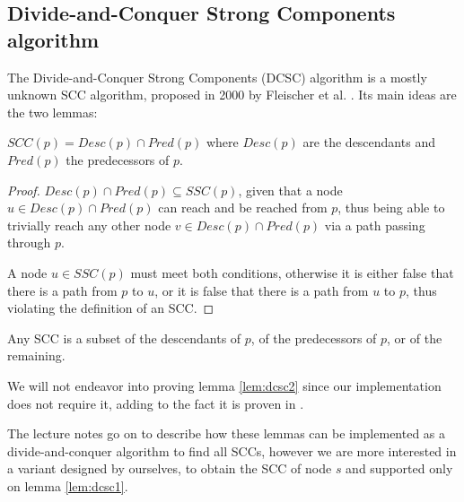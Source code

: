 \subsection[DCSC algorithm]{Divide-and-Conquer Strong Components algorithm} \label{algorithm-scc-dcsc}
The Divide-and-Conquer Strong Components (DCSC) algorithm is a mostly unknown SCC algorithm, proposed in 2000 by Fleischer et al. \cite{fleischer-dcsc}. Its main ideas are the two lemmas:
\begin{lemma} \label{lem:dcsc1}
    $SCC(p)=Desc(p) \cap Pred(p)$ where $Desc(p)$ are the descendants and $Pred(p)$ the predecessors of $p$.
\end{lemma}
\begin{proof}
    $Desc(p) \cap Pred(p) \subseteq SSC(p)$, given that a node $u \in Desc(p) \cap Pred(p)$ can reach and be reached from $p$, thus being able to trivially reach any other node $v \in Desc(p) \cap Pred(p)$ via a path passing through $p$.\par
    A node $u \in SSC(p)$ must meet both conditions, otherwise it is either false that there is a path from $p$ to $u$, or it is false that there is a path from $u$ to $p$, thus violating the definition of an SCC.
\end{proof}
\begin{lemma} \label{lem:dcsc2}
    Any SCC is a subset of the descendants of $p$, of the predecessors of $p$, or of the remaining.
\end{lemma}
We will not endeavor into proving lemma \ref{lem:dcsc2} since our implementation does not require it, adding to the fact it is proven in \cite{fleischer-dcsc}.\par
The lecture notes go on to describe how these lemmas can be implemented as a divide-and-conquer algorithm to find all SCCs, however we are more interested in a variant designed by ourselves, to obtain the SCC of node $s$ and supported only on lemma \ref{lem:dcsc1}.
